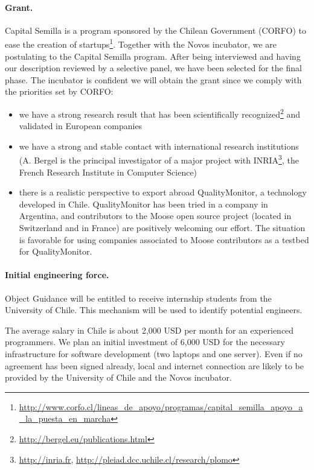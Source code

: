 \documentclass[runningheads]{llncs}
\begin{document}
\paragraph{Grant.} Capital Semilla is a program sponsored by the Chilean Government (CORFO) to ease the creation of startups\footnote{\url{http://www.corfo.cl/lineas_de_apoyo/programas/capital_semilla_apoyo_a_la_puesta_en_marcha}}. Together with the Novos incubator, we are postulating to the Capital Semilla program. After being interviewed and having our description reviewed by a selective panel, we have been selected for the final phase. The incubator is confident we will obtain the grant since we comply with the priorities set by CORFO: 
\begin{itemize}
\item we have a strong research result that has been scientifically recognized\footnote{\url{http://bergel.eu/publications.html}} and validated in European companies
\item we have a strong and stable contact with international research institutions (A. Bergel is the principal investigator of a major project with INRIA\footnote{\url{http://inria.fr}, \url{http://pleiad.dcc.uchile.cl/research/plomo}}, the French Research Institute in Computer Science)
\item there is a realistic perspective to export abroad QualityMonitor, a technology developed in Chile. QualityMonitor has been tried in a company in Argentina, and contributors to the Moose open source project (located in Switzerland and in France) are positively welcoming our effort. The situation is favorable for using companies associated to Moose contributors as a testbed for QualityMonitor.
\end{itemize}

\paragraph{Initial engineering force.} Object Guidance will be entitled to receive internship students from the University of Chile. This mechanism will be used to identify potential engineers.

The average salary in Chile is about 2,000 USD per month for an experienced programmers. We plan an initial investment of 6,000 USD for the necessary infrastructure for software development (two laptops and one server). Even if no agreement has been signed already, local and internet connection are likely to be provided by the University of Chile and the Novos incubator. 
\end{document}

